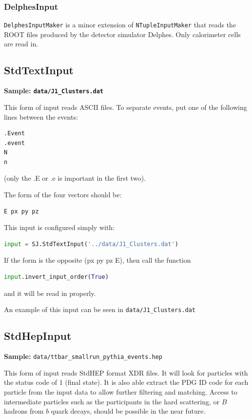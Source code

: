 \documentclass{article}
\newcommand{\prog}[1]{{\sc #1}\xspace}
\newcommand{\code}[1]{{\tt #1}\xspace}
\begin{document}
\subsubsection*{DelphesInput}

\code{DelphesInputMaker} is a minor extension of \code{NTupleInputMaker} that reads the \prog{ROOT} files produced by the detector simulator \prog{Delphes}.  Only calorimeter cells are read in.


\subsection{StdTextInput}
{\bf Sample: \verb+data/J1_Clusters.dat+}

This form of input reads ASCII files.  To separate events, put one of the following lines between the events:
\begin{verbatim}
.Event
.event
N
n
\end{verbatim}
(only the .E or .e is important in the first two).

The form of the four vectors should be:
\begin{verbatim}
E px py pz
\end{verbatim}

This input is configured simply with:
\begin{lstlisting}[language=Python]
input = SJ.StdTextInput('../data/J1_Clusters.dat')
\end{lstlisting}

If the form is the opposite (px py pz E), then call the function
\begin{lstlisting}[language=Python]
input.invert_input_order(True)
\end{lstlisting}
and it will be read in properly.

An example of this input can be seen in 
\verb+data/J1_Clusters.dat+
 
\subsection{StdHepInput }
{\bf Sample:} \verb+data/ttbar_smallrun_pythia_events.hep+

This form of input reads StdHEP format XDR files. It will look for
particles with the status code of 1 (final state).  It is also able extract the PDG ID code for each particle from the input data to allow further filtering and matching.  Access to intermediate particles such as the participants in the hard scattering, or $B$ hadrons from $b$ quark decays, should be possible in the near future.
\end{document}
